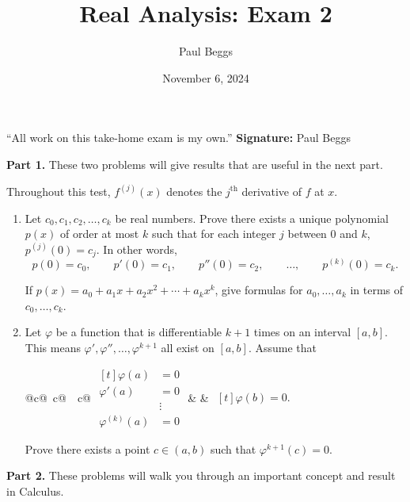 \documentclass[12pt]{article}
\title{Real Analysis: Exam 2}
\author{Paul Beggs}
\date{November 6, 2024}
\begin{document}
\maketitle

``All work on this take-home exam is my own.'' \hfill \textbf{Signature:} Paul Beggs

\vspace{0.5cm}

\noindent\textbf{Part 1.} These two problems will give results that are useful in the next part. 

\noindent Throughout this test, \(f^{(j)}(x)\) denotes the \(j^{\text{th}}\) derivative of \(f\) at \(x\).

\begin{enumerate}
    \item Let \(c_{0}, c_{1}, c_{2},\dots,c_{k}\) be real numbers. Prove there exists a unique polynomial \(p(x)\) of order at most \(k\) such that for each integer \(j\) between 0 and \(k\), \(p^{(j)}(0) = c_{j}\). In other words,
    \[
        p(0) = c_{0}, \qquad p'(0) = c_{1}, \qquad p''(0) = c_{2}, \qquad \ldots, \qquad  p^{(k)}(0) = c_{k}.
    \]

    If \(p(x) = a_{0} + a_{1}x + a_{2}x^{2} + \cdots + a_{k}x^{k}\), give formulas for \(a_{0},\dots,a_{k}\) in terms of \(c_{0},\dots,c_{k}\).
    \vfill
    \item Let \(\varphi\) be a function that is differentiable \(k + 1\) times on an interval \([a,b]\). This means \(\varphi',\varphi'',\dots,\varphi^{k + 1}\) all exist on \([a,b]\). Assume that

\begin{table}[htbp]
    \centering
    \begin{tabular}{@{}c@{\qquad\quad~}c@{\qquad\quad~~}c@{}}
        \(\begin{aligned}[t]
            \varphi(a) &= 0 \\
            \varphi'(a) &= 0 \\
            &\vdots \\
            \varphi^{(k)}(a) &= 0
        \end{aligned}\)
        &  &
        \(\begin{aligned}[t]
            \varphi(b) = 0.
        \end{aligned}\)
    \end{tabular}
\end{table}


Prove there exists a point \(c \in (a,b)\) such that \(\varphi^{{k + 1}}(c) = 0\).

\end{enumerate}
\newpage
\noindent\textbf{Part 2.} These problems will walk you through an important concept and result in Calculus.\\
\end{document}
